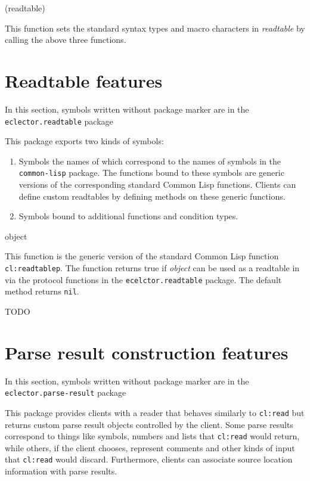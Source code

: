  (readtable)

This function sets the standard syntax types and macro characters in
\textit{readtable} by calling the above three functions.

\section{Readtable features}
\label{sec:readtable-features}

In this section, symbols written without package marker are in the
\texttt{eclector.readtable} package

This package exports two kinds of symbols:

\begin{enumerate}
\item Symbols the names of which correspond to the names of symbols in
  the \texttt{common-lisp} package.  The functions bound to these
  symbols are generic versions of the corresponding standard Common
  Lisp functions.  Clients can define custom readtables by defining
  methods on these generic functions.
\item Symbols bound to additional functions and condition types.
\end{enumerate}

 {object}

This function is the generic version of the standard Common Lisp
function \texttt{cl:readtablep}.  The function returns true if
\textit{object} can be used as a readtable in \sysname via the
protocol functions in the \texttt{ecelctor.readtable} package.  The
default method returns \texttt{nil}.

TODO

\section{Parse result construction features}
\label{sec:parse-result-construction-features}

In this section, symbols written without package marker are in the
\texttt{eclector.parse-result} package

This package provides clients with a reader that behaves similarly to
\texttt{cl:read} but returns custom parse result objects controlled by
the client.  Some parse results correspond to things like symbols,
numbers and lists that \texttt{cl:read} would return, while others, if
the client chooses, represent comments and other kinds of input that
\texttt{cl:read} would discard.  Furthermore, clients can associate
source location information with parse results.

